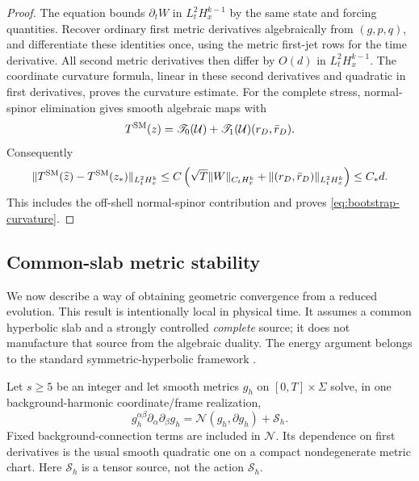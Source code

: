 \documentclass[11pt]{article}
\numberwithin{equation}{section}
\theoremstyle{definition}
\theoremstyle{remark}
\newcommand{\norm}[1]{\lVert#1\rVert}
\newcommand{\Sact}{\mathscr S}
\begin{document}
\begin{proof}
The equation bounds $\partial_tW$ in $L_t^2H_x^{k-1}$ by the same state and
forcing quantities. Recover ordinary first metric derivatives algebraically
from $(g,p,q)$, and differentiate these identities once, using the metric
first-jet rows for the time derivative. All second metric derivatives then
differ by $O(d)$ in $L_t^2H_x^{k-1}$. The coordinate curvature formula,
linear in these second derivatives and quadratic in first derivatives,
proves the curvature estimate. For the complete stress, normal-spinor
elimination gives smooth algebraic maps with
\[
 T^{\rm SM}(z)=\mathscr T_0(\mathcal U)
                  +\mathscr T_1(\mathcal U)(r_D,\bar r_D).
\]
Consequently
\[
 \norm{T^{\rm SM}(\widehat z)-T^{\rm SM}(z_*)}_{L_t^2H_x^k}
 \le C\left(\sqrt T\norm W_{C_tH_x^k}
                   +\norm{(r_D,\bar r_D)}_{L_t^2H_x^k}\right)
 \le C_*d.
\]
This includes the off-shell normal-spinor contribution and proves
\eqref{eq:bootstrap-curvature}.
\end{proof}

\subsection{Common-slab metric stability}
\label{sec:propagation}

We now describe a way of obtaining geometric convergence from a reduced evolution. This result is intentionally local in physical time. It assumes a common hyperbolic slab and a strongly controlled \emph{complete} source; it does not manufacture that source from the algebraic duality. The energy argument belongs to the standard symmetric-hyperbolic framework \cite{Kato1975,FriedrichRendall2000}.

Let $s\ge5$ be an integer and let smooth metrics $g_h$ on $[0,T]\times\Sigma$ solve, in one background-harmonic coordinate/frame realization,
\begin{equation}
 g_h^{\alpha\beta}\partial_\alpha\partial_\beta g_h
 =\mathcal N(g_h,\partial g_h)+\mathcal S_h.
 \label{eq:reduced-wave}
\end{equation}
Fixed background-connection terms are included in $\mathcal N$. Its dependence on first derivatives is the usual smooth quadratic one on a compact nondegenerate metric chart. Here $\mathcal S_h$ is a tensor source, not the action $\Sact_h$.
\end{document}
